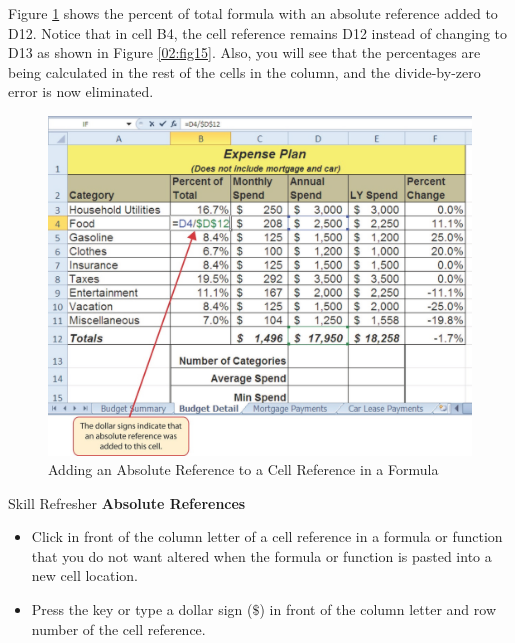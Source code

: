 Figure \ref{02:fig16} shows the percent of total formula with an absolute reference added to \textsf{D12}. Notice that in cell \textsf{B4}, the cell reference remains \textsf{D12} instead of changing to \textsf{D13} as shown in Figure \ref{02:fig15}. Also, you will see that the percentages are being calculated in the rest of the cells in the column, and the divide-by-zero error is now eliminated.

\begin{figure}[H]
	\centering
	\includegraphics[width=\maxwidth{.95\linewidth}]{gfx/ch02_fig16}
	\caption{Adding an Absolute Reference to a Cell Reference in a Formula}
	\label{02:fig16}
\end{figure}

\begin{center}
	\begin{sklbox}{Skill Refresher}
		\textbf{Absolute References}
		\\
		\begin{itemize}
			\setlength{\itemsep}{0pt}
			\setlength{\parskip}{0pt}
			\setlength{\parsep}{0pt}
			
			\item Click in front of the column letter of a cell reference in a formula or function that you do not want altered when the formula or function is pasted into a new cell location.
			\item Press the  key or type a dollar sign ($ \$ $) in front of the column letter and row number of the cell reference.

		\end{itemize}
	\end{sklbox}
\end{center}

